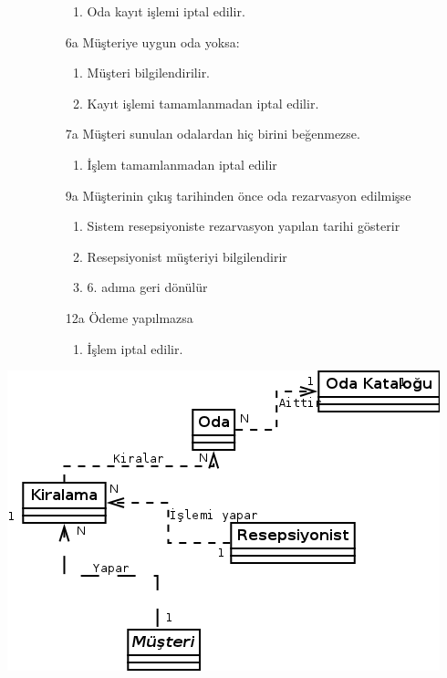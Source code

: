 \documentclass[12pt,a4paper]{report}
\begin{document}
\begin{description}
\begin{itemize}
\begin{enumerate}
    \item Oda kayıt işlemi iptal edilir.
    \end{enumerate}
\item[6a] Müşteriye uygun oda yoksa:
    \begin{enumerate} 
    \item Müşteri bilgilendirilir.
    \item Kayıt işlemi tamamlanmadan iptal edilir.
    \end{enumerate}
\item[7a] Müşteri sunulan odalardan hiç birini beğenmezse.
    \begin{enumerate}
    \item İşlem tamamlanmadan iptal edilir
    \end{enumerate}
\item[9a] Müşterinin çıkış tarihinden önce oda rezarvasyon edilmişse
    \begin{enumerate}
    \item Sistem resepsiyoniste rezarvasyon yapılan tarihi gösterir
    \item Resepsiyonist müşteriyi bilgilendirir
    \item 6. adıma geri dönülür
    \end{enumerate}
\item[12a] Ödeme yapılmazsa
    \begin{enumerate}
    \item İşlem iptal edilir.
    \end{enumerate}
\end{itemize}
\end{description}

\begin{center}
\includegraphics{dia/usecase2.png}
\end{center}
\end{document}
